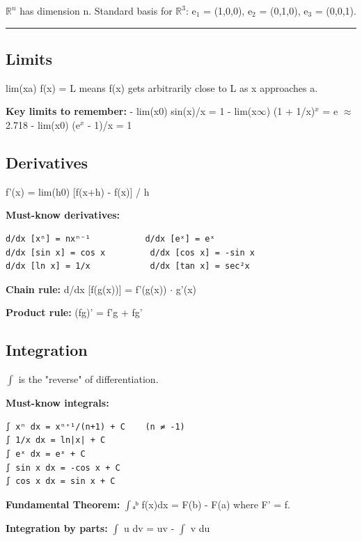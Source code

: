 \documentclass[12pt,a4paper,openany]{book}
\begin{document}
$\mathbb{R}^n$ has dimension n. Standard basis for $\mathbb{R}^3$: e$_1$ = (1,0,0), e$_2$ = (0,1,0), e$_3$ = (0,0,1).

\bigskip\noindent\rule{\textwidth}{0.4pt}\bigskip


\subsection{Limits}

lim(xa) f(x) = L means f(x) gets arbitrarily close to L as x approaches a.

\begin{tcolorbox}[colback=warningbg!30,colframe=warningborder,title=\textbf{Important -- Exam Alert},breakable,boxrule=1.5pt]
\textbf{Key limits to remember:}
- lim(x0) sin(x)/x = 1
- lim(x$\infty$) (1 + 1/x)$^x$ = e $\approx$ 2.718
- lim(x0) (e$^x$ - 1)/x = 1
\end{tcolorbox}

\subsection{Derivatives}

f'(x) = lim(h0) [f(x+h) - f(x)] / h

\textbf{Must-know derivatives:}
\begin{verbatim}
d/dx [xⁿ] = nxⁿ⁻¹           d/dx [eˣ] = eˣ
d/dx [sin x] = cos x         d/dx [cos x] = -sin x
d/dx [ln x] = 1/x            d/dx [tan x] = sec²x
\end{verbatim}

\textbf{Chain rule:} d/dx [f(g(x))] = f'(g(x)) $\cdot$ g'(x)

\textbf{Product rule:} (fg)' = f'g + fg'

\subsection{Integration}

$\int$ is the "reverse" of differentiation.

\textbf{Must-know integrals:}
\begin{verbatim}
∫ xⁿ dx = xⁿ⁺¹/(n+1) + C    (n ≠ -1)
∫ 1/x dx = ln|x| + C
∫ eˣ dx = eˣ + C
∫ sin x dx = -cos x + C
∫ cos x dx = sin x + C
\end{verbatim}

\textbf{Fundamental Theorem:} $\int$ₐᵇ f(x)dx = F(b) - F(a) where F' = f.

\textbf{Integration by parts:} $\int$ u dv = uv - $\int$ v du
\end{document}
